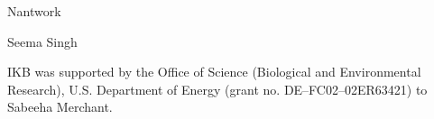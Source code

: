 \documentclass[aps,pra,preprint,superscriptaddress]{revtex4-1}
\begin{document}
%



\begin{acknowledgments}
Nantwork

Seema Singh

IKB was supported by the Office of Science (Biological and Environmental Research), U.S. Department of Energy (grant no. DE–FC02–02ER63421) to Sabeeha Merchant.
\end{acknowledgments}


\end{document}
